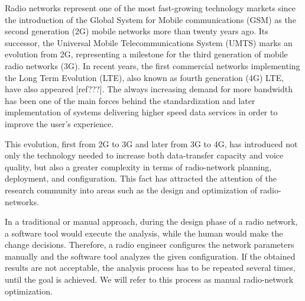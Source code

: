 Radio networks represent one of the most fast-growing technology markets
since the introduction of the Global System for Mobile communications
(GSM)
\cite{3GPP_TR_50.099} as the second generation (2G)
mobile networks more than twenty years ago. Its successor, the Universal
Mobile Telecommunications System (UMTS)
\cite{3GPP_TR_23.101} marks an evolution from 2G, representing a
milestone for the third generation of mobile radio networks (3G).
In recent years, the first commercial networks implementing the Long
Term Evolution (LTE), also known as fourth generation (4G) LTE, have
also appeared {[}ref???{]}. The always increasing demand for more
bandwidth has been one of the main forces behind the standardization
and later implementation of systems delivering higher speed data services
in order to improve the user's experience.

This evolution, first from 2G to 3G and later from 3G to 4G, has introduced
not only the technology needed to increase both data-transfer capacity
and voice quality, but also a greater complexity in terms of radio-network
planning, deployment, and configuration. This fact has attracted the
attention of the research community into areas such as the design
and optimization of radio-networks.

In a traditional or manual approach, during the design phase of a
radio network, a software tool would execute the analysis, while the
human would make the change decisions. Therefore, a radio engineer
configures the network parameters manually and the software tool analyzes
the given configuration. If the obtained results are not acceptable,
the analysis process has to be repeated several times, until the goal
is achieved. We will refer to this process as manual radio-network
optimization. 

